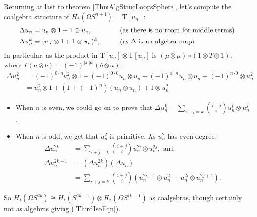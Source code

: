 \documentclass{article}
\newcommand{\Loops}{\Omega}
\begin{document}
Returning at last to theorem \ref{ThmAlgStrucLoopsSphere}, let's compute the coalgebra structure of $H_* (\Loops S^{n+1}) =\mathrm T[u_n]$:
\begin{alignat*}{2}
\Delta u_n & = u_n \otimes 1 + 1 \otimes u_n,&\qquad&\textup{(as there is no room for middle terms)} \\
\Delta u_n^k & = (u_n \otimes 1 + 1 \otimes u_n)^k,&&\textup{(as $\Delta$ is an algebra map)}
\end{alignat*}
In particular, as the product in $\mathrm T[u_n]\otimes \mathrm T[u_n]$ is $(\mu\otimes\mu)\circ (1\otimes T\otimes1)$, where $T(a\otimes b)=(-1)^{|a||b|}(b\otimes a)$:
\begin{align*}
\Delta u_n^2&=(-1)^{0\cdot n}u_n^2\otimes1+(-1)^{0\cdot0}u_n\otimes u_n+(-1)^{n\cdot n}u_n\otimes u_n+(-1)^{n\cdot 0}\otimes u_n^2\\
&=u_n^2\otimes1+(1+(-1)^{n})(u_n\otimes u_n)+1\otimes u_n^2
\end{align*}
\begin{itemize}
\item When $n$ is even, we could go on to prove that $\Delta u_n^k = {\displaystyle\sum_{i + j = k}} \binom{i+j}{i} u_n^i \otimes u_n^j$.
\item When $n$ is odd, we get that $u_n^2$ is primitive. As $u_n^2$ has even degree:
\begin{align*}
\Delta u_n^{2k} & = \sum_{i+j=k} {\textstyle\binom{i+j}{i}} u_n^{2i} \otimes u_n^{2j}, \text{ \ and}\\
\Delta u_n^{2k+1} & = (\Delta u_n^{2k})(\Delta u_n) \\
& = \sum_{i+j=k} {\textstyle\binom{i+j}{i}} (u_n^{2i+1} \otimes u_n^{2j} + u_n^{2i} \otimes u_n^{2j+1}).
\end{align*}
\end{itemize}
So $H_* (\Loops S^{2k} )\cong H_*( S^{2k-1}) \otimes H_* (\Loops S^{4k-1})$ as coalgebras, though certainly not as algebras giving (\ref{ThirdIsoEqn}).
\end{document}
